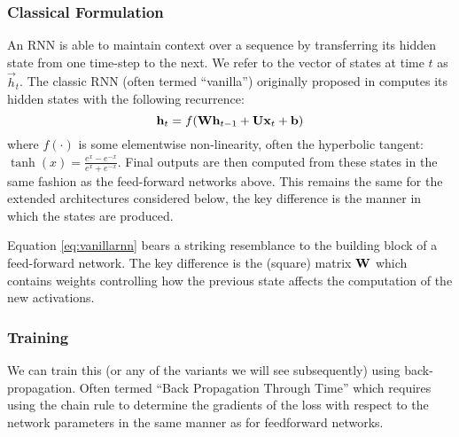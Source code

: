 \subsubsection{Classical Formulation}
An RNN is able to maintain context over a sequence by transferring its hidden state from one
time-step to the next. We refer to the vector of states at time \(t\) as \(\vec{h}_t\).
The classic RNN (often termed ``vanilla'') originally proposed in \autocite{Elman1990}
computes its hidden states with the following recurrence:
\begin{equation}
	\mathbf{h}_t = f(\mathbf{W}\mathbf{h}_{t-1} + \mathbf{U}\mathbf{x}_t +  \mathbf{b})
\label{eq:vanillarnn}
\end{equation} where \(f(\cdot)\) is some elementwise non-linearity, often the hyperbolic tangent:
\(\tanh(x) = \frac{e^{x} - e^{-x}}{e^{x} + e^{-x}}\). Final outputs are then computed from these
states in the same fashion as the feed-forward networks above. This remains the same for the
extended architectures considered below, the key difference is the manner in which the states
are produced.

Equation \eqref{eq:vanillarnn} bears a striking resemblance to the building block of a 
feed-forward network. The key difference is the (square) matrix \(\mathbf{W}\) which contains weights
controlling how the previous state affects the computation of the new activations.

\subsubsection{Training}
We can train this (or any of the variants we will see subsequently) using back-propagation.
Often termed ``Back Propagation Through Time'' \autocite{Werbos1990} which requires using the
chain rule to determine the gradients of the loss with respect to the network parameters in
the same manner as for feedforward networks.

